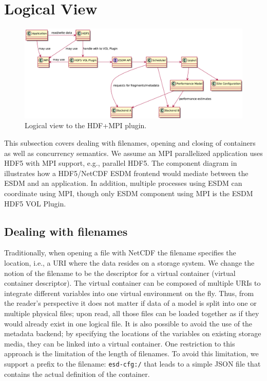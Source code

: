 \section{Logical View}
\begin{figure}
	\centering
	\includegraphics[width=\linewidth]{figures/logical}
	\caption{Logical view to the HDF+MPI plugin.}
	\label{fig:esdm hdf5 logical view}
\end{figure}

This subsection covers dealing with filenames, opening and closing of containers as well as concurrency semantics.
We assume an MPI parallelized application uses HDF5 with MPI support, e.g., parallel HDF5.
The component diagram in  illustrates how a HDF5/NetCDF ESDM frontend would mediate between the ESDM and an application.
In addition, multiple processes using ESDM can coordinate using MPI, though only ESDM component using MPI is the ESDM HDF5 VOL Plugin.

\subsection{Dealing with filenames}

Traditionally, when opening a file with NetCDF the filename specifies the location, i.e., a URI where the data resides on a storage system.
We change the notion of the filename to be the descriptor for a virtual container (virtual container descriptor).
The virtual container can be composed of multiple URIs to integrate different variables into one virtual environment on the fly.
Thus, from the reader's perspective it does not matter if data of a model is split into one or multiple physical files; upon read, all those files can be loaded together as if they would already exist in one logical file.
It is also possible to avoid the use of the metadata backend; by specifying the locations of the variables on existing storage media, they can be linked into a virtual container.
One restriction to this approach is the limitation of the length of filenames.
To avoid this limitation, we support a prefix to the filename: \texttt{esd-cfg:/} that leads to a simple JSON file that contains the actual definition of the container.

